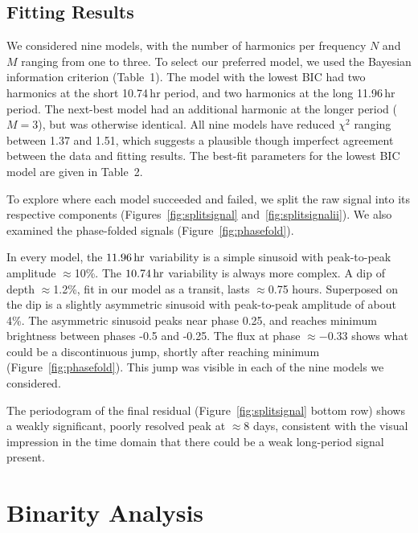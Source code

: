 \documentclass[12pt,twocolumn,tighten]{aastex62}
\newcommand{\ptfo}{PTFO$\,$8-8695}
\begin{document}
\subsection{Fitting Results}

We considered nine models, with the number of harmonics per frequency
$N$ and $M$ ranging from one to three.  To select our preferred model,
we used the Bayesian information criterion
(Table~1).  The model with the lowest BIC had
two harmonics at the short 10.74$\,$hr period, and two harmonics
at the long 11.96$\,$hr period.  
The next-best model had an additional harmonic at the longer period ($M=3$),
but was otherwise identical.
All nine models have reduced
$\chi^2$ ranging between 1.37 and 1.51, which suggests a plausible
though imperfect agreement between the data and fitting results.
The best-fit parameters for the lowest BIC model are given in Table~2.

To explore where each model succeeded and failed, we split the raw
signal into its respective components (Figures~\ref{fig:splitsignal}
and~\ref{fig:splitsignalii}).  We also examined the phase-folded
signals (Figure~\ref{fig:phasefold}).  

In every model, the $11.96\,{\rm hr}$ variability is a simple
sinusoid with peak-to-peak amplitude $\approx$10\%.  The $10.74\,{\rm hr}$ variability
is always more complex.  A dip of depth
$\approx$1.2\%, fit in our model as a transit, lasts $\approx$0.75
hours.  Superposed on the dip is a slightly asymmetric sinusoid with peak-to-peak
amplitude of about 4\%. The asymmetric sinusoid peaks near phase 0.25, and reaches
minimum brightness between phases -0.5 and -0.25.
The flux at phase $\approx -0.33$ shows what could
be a discontinuous jump, shortly after reaching minimum (Figure~\ref{fig:phasefold}).  This jump
was visible in each of the nine models we considered.

The periodogram of the final residual (Figure~\ref{fig:splitsignal}
bottom row) shows a weakly significant, poorly resolved peak at
$\approx$8 days, consistent with the visual impression in the time
domain that there could be a weak long-period signal present.



\section{Binarity Analysis}
\label{sec:gaia}

\end{document}
